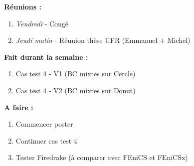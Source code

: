 \textbf{Réunions :}
\begin{enumerate}[label=\textbullet]
	\item \textit{Vendredi} - Congé
	\item \textit{Jeudi matin} - Réunion thèse UFR (Emmanuel + Michel)
\end{enumerate}
\textbf{Fait durant la semaine :}
\begin{enumerate}[label=\textbullet]
	\item Cas test 4 - V1 (BC mixtes sur Cercle)
	\item Cas test 4 - V2 (BC mixtes sur Donut)
\end{enumerate}
\textbf{A faire :}
\begin{enumerate}[label=\textbullet]
	\item Commencer poster
	\item Continuer cas test 4
	\item Tester Firedrake (à comparer avec FEniCS et FEniCSx)
\end{enumerate}